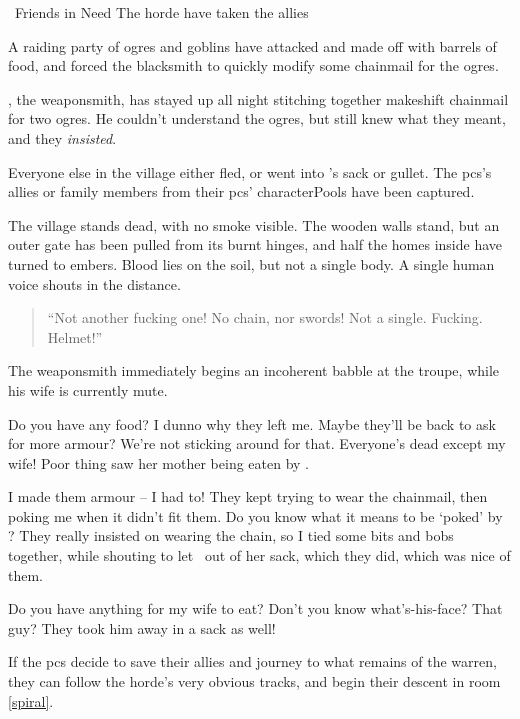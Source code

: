 {~Friends in Need}%
{The horde have taken the  allies}%

\begin{exampletext}
  A raiding party of \glspl{ogre} and goblins have attacked  and made off with barrels of food, and forced the blacksmith to quickly modify some chainmail for the \glspl{ogre}.
\end{exampletext}

\composeHumanName, the weaponsmith, has stayed up all night stitching together makeshift chainmail for two \glspl{ogre}.
He couldn't understand the \glspl{ogre}, but still knew what they meant, and they \emph{insisted}.

Everyone else in the \gls{village} either fled, or went into 's sack or gullet.
The \glspl{pc}'s allies or family members from their \glspl{pc}' \glspl{characterPool} have been captured.

\begin{boxtext}
  The \gls{village} stands dead, with no smoke visible.
  The wooden walls stand, but an outer gate has been pulled from its burnt hinges, and half the homes inside have turned to embers.
  Blood lies on the soil, but not a single body.
  A single human voice shouts in the distance.

  \begin{quotation}
    ``Not another fucking one!
    No chain, nor swords!
    Not a single. Fucking. Helmet!''
  \end{quotation}
\end{boxtext}


The weaponsmith immediately begins an incoherent babble at the troupe, while his wife is currently mute.

\null
\begin{speechtext}
  Do you have any food?
  I dunno why they left me.
  Maybe they'll be back to ask for more armour?
  We're not sticking around for that.
  Everyone's dead except my wife!
  Poor thing saw her mother being eaten by .

  I made them armour -- I had to!
  They kept trying to wear the chainmail, then poking me when it didn't fit them.
  Do you know what it means to be `poked' by ?
  They really insisted on wearing the chain, so I tied some bits and bobs together, while shouting to let \composeHumanName\ out of her sack, which they did, which was nice of them.

  Do you have anything for my wife to eat?
  Don't you know what's-his-face?
  That guy?
  They took him away in a sack as well!
\end{speechtext}

If the \glspl{pc} decide to save their allies and journey to what remains of the \gls{warren}, they can follow the horde's very obvious tracks, and begin their descent in room \vref{spiral}.
